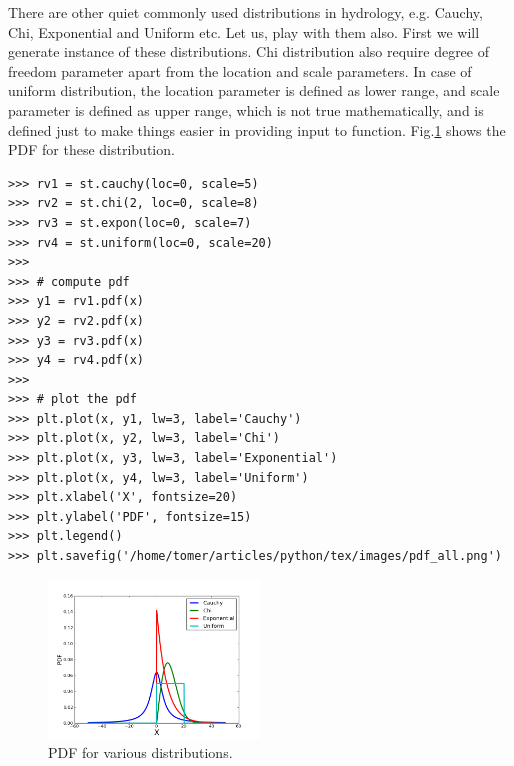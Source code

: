 \documentclass[10pt]{book}
\begin{document}
{There are other quiet commonly used distributions in hydrology, e.g. Cauchy, Chi, Exponential and Uniform etc. Let us, play with them also. First we will generate instance of these distributions. Chi distribution also require degree of freedom parameter apart from the location and scale parameters. In case of uniform distribution, the location parameter is defined as lower range, and scale parameter is defined as upper range, which is not true mathematically, and is defined just to make things easier in providing input to function. Fig.\ref{fig:pdf_all} shows the PDF for these distribution. 

\beforeverb \begin{verbatim}
>>> rv1 = st.cauchy(loc=0, scale=5)
>>> rv2 = st.chi(2, loc=0, scale=8)
>>> rv3 = st.expon(loc=0, scale=7)
>>> rv4 = st.uniform(loc=0, scale=20)
>>> 
>>> # compute pdf 
>>> y1 = rv1.pdf(x)
>>> y2 = rv2.pdf(x)
>>> y3 = rv3.pdf(x)
>>> y4 = rv4.pdf(x)
>>> 
>>> # plot the pdf
>>> plt.plot(x, y1, lw=3, label='Cauchy')
>>> plt.plot(x, y2, lw=3, label='Chi')
>>> plt.plot(x, y3, lw=3, label='Exponential')
>>> plt.plot(x, y4, lw=3, label='Uniform')
>>> plt.xlabel('X', fontsize=20)
>>> plt.ylabel('PDF', fontsize=15)
>>> plt.legend()
>>> plt.savefig('/home/tomer/articles/python/tex/images/pdf_all.png')
\end{verbatim}
\afterverb

\beforefig
\begin{figure}[h!]
  \centering
    \includegraphics[width=0.5\textwidth]{images/pdf_all.png}
  \caption{PDF for various distributions.}
   \label{fig:pdf_all}
\end{figure}
\afterfig

}
\end{document}
